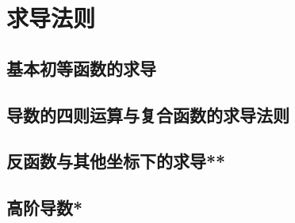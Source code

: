 \section{求导法则}
\subsection{基本初等函数的求导}
\clearpage
\subsection{导数的四则运算与复合函数的求导法则}
\clearpage
\subsection{反函数与其他坐标下的求导**}
\clearpage
\subsection{高阶导数*}
\clearpage

